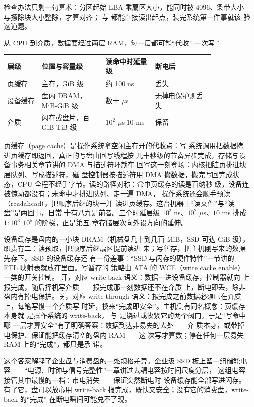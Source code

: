 检查办法只剩一句算术：分区起始 LBA 乘扇区大小，能同时被
4096、条带大小与擦除块大小整除，才算对齐；
与  都能直接读出起点，装完系统第一件事就该
验这道题。

从 CPU 到介质，数据要经过两层 RAM，每一层都可能“代收”
一次写：

\begin{longtable}{L{0.14\linewidth}L{0.26\linewidth}L{0.2\linewidth}L{0.24\linewidth}}
\toprule
层级 & 位置与容量级 & 读命中时延量级 & 断电后 \\
\midrule
页缓存 & 主存，GiB 级 & 约 100 ns & 丢失 \\\tablerowrule
设备缓存 & 盘内 DRAM，MiB-GiB 级 & 数十 $\mu$s & 无掉电保护则丢失 \\\tablerowrule
介质 & 闪存或盘片，百 GiB-TiB 级 & $10^{2}$ $\mu$s-$10$ ms & 保留 \\
\bottomrule
\end{longtable}

页缓存（page cache）是操作系统拿空闲主存开的代收点：写
系统调用把数据拷进页缓存即返回，真正的写盘由回写线程按
几十秒级的节奏异步完成。存储与设备事务相关章节讲的 DMA 与描述符环就在
回写这一刻登场：内核把脏页排进块层队列、写成描述符，磁
盘控制器按描述符用 DMA 搬数据，搬完写回完成状态，CPU
全程不经手字节。读的路径对称：命中页缓存的读是百纳秒
级，设备连被惊动都没有；未命中才排进队列、走一遍 DMA，
操作系统还会顺手预读（readahead），把顺序后继的块一并
读进页缓存。这台机器上“读文件”与“读盘”是两回事，日常
十有八九是前者。三个时延层级 $10^{2}$ ns、$10^{2}$
$\mu$s、$10$ ms 排成 $1:10^{3}:10^{5}$ 的阶梯，正是第五
章存储层次向外设方向的延伸。

设备缓存是盘内的一小块 DRAM（机械盘几十到几百 MiB，SSD
可达 GiB 级），职责有二：读预取，把顺序后继扇区提前读进
来；写暂存，把主机刚写来的数据先存下。SSD 的设备缓存还
有一份差事：“SSD 与闪存的硬件特性”一节讲的 FTL 映射表就放在里面。写暂存的
策略由 ATA 的 WCE（write cache enable）一类的开关控制。
开，对应 write-back 语义：数据一进设备缓存，控制器就向
上报完成，随后择机写介质——报完成那一刻数据还不在介质
上，断电即丢，除非盘内有掉电保护。关，对应 write-through
语义：报完成之前数据必须已在介质上，每笔写慢一个介质写
时延，换来“完成即安全”。主机侧有同名概念：页缓存本身就
是操作系统的 write-back， 与
 是绕过或收紧它的两个阀门。于是“写命中哪
一层才算安全”有了明确答案：数据到达非易失的去处——介
质本身，或带掉电保护、保证能把缓存清空的盘内 RAM——这
次写才算数；停在任何一层易失 RAM 上的“完成”，都只是承
诺。

这个答案解释了企业盘与消费盘的一处规格差异。企业级 SSD
板上留一组储能电容——“电源、时钟与信号完整性”一章讲过去耦电容按时间尺度分层，
这组电容接管其中最慢的一档：市电消失——保证突然断电时
设备缓存能全部写进闪存。有了它，盘可以放心用 write-back
报完成，既快又安全；没有它的消费盘，write-back 的“完成”
在断电瞬间可能兑不了现。

